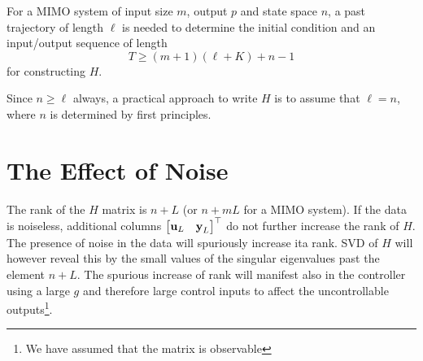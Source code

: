 For a MIMO system of input size $m$, output $p$ and state space $n$, a past trajectory of length $\ell$ is needed to determine the initial condition and an input/output sequence of length
\begin{equation*}
  T \ge (m+1)(\ell + K) + n -1
\end{equation*}
for constructing $H$.

Since $n\ge \ell$ always, a practical approach to write $H$ is to assume that $\ell = n$, where $n$ is determined by first principles.

\section{The Effect of Noise}
\label{sec:deepc-presence-of-noise}

The rank of the $H$ matrix is $n+L$ (or $n+mL$ for a MIMO system). If the data is noiseless, additional columns $
\begin{bmatrix}
  \boldsymbol{\mathrm{u}}_L & \boldsymbol{\mathrm{y}}_L
\end{bmatrix}^\top
$ do not further increase the rank of $H$. The presence of noise in the data will spuriously increase ita rank. SVD of $H$ will however reveal this by the small values of the singular eigenvalues past the element $n+L$. The spurious increase of rank will manifest also in the controller using a large $g$ and therefore large control inputs to affect the uncontrollable outputs\footnote{We have assumed that the matrix is observable}.

